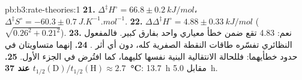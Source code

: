 \begin{solution}{pb:b3:rate-theories:1}
\textbf{21.} $\Delta^{\ddagger}H^\circ = 66.8 \pm \qty{0.2}{kJ/mol}$، $\Delta^{\ddagger}S^\circ = -60.3 \pm \qty{0.7}{J.K^{-1}.mol^{-1}}$.
\textbf{22.} $\Delta\Delta^{\ddagger}H^\circ = 4.88 \pm \qty{0.33}{kJ/mol}$ ($\sqrt{0.26^2 + 0.21^2}$).
\textbf{23.} نعم: 4.83 تقع ضمن خطأ معياري واحد بفارق كبير. فالمفعول النظائري
تفسّره طاقات النقطة الصفرية كله، دون أي أثر .
\textbf{24.} إنهما متساويتان في حدود خطأيهما: فللحالة الانتقالية البنية نفسها
 كليهما، كما افتُرض في الجزء الأول.
\textbf{25.} \textbf{$t_{1/2}(\mathrm D)/t_{1/2}(\mathrm H) \approx 2.7$ عند \qty{37}{\celsius}}: \qty{13.7}{h} مقابل \qty{5.0}{h}.
\end{solution}
